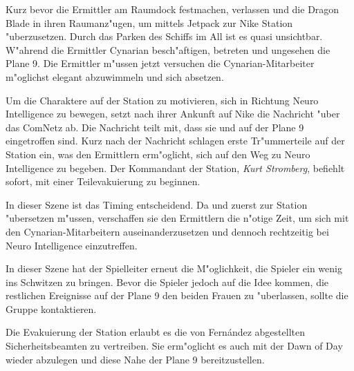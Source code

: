 Kurz bevor die Ermittler am Raumdock festmachen, verlassen \xl{} und \ml{} die Dragon Blade in ihren Raumanz"ugen, um mittels Jetpack zur Nike Station "uberzusetzen. Durch das Parken des Schiffs im All ist es quasi unsichtbar. W"ahrend die Ermittler Cynarian besch"aftigen, betreten \xl{} und \ml{} ungesehen die Plane 9. Die Ermittler m"ussen jetzt versuchen die Cynarian-Mitarbeiter m"oglichst elegant abzuwimmeln und sich absetzen.

Um die Charaktere auf der Station zu motivieren, sich in Richtung Neuro Intelligence zu bewegen, setzt \ml{} nach ihrer Ankunft auf Nike die Nachricht  "uber das ComNetz ab. Die Nachricht teilt mit, dass sie und \xl{} auf der Plane 9 eingetroffen sind. Kurz nach der Nachricht schlagen erste Tr"ummerteile auf der Station ein, was den Ermittlern erm"oglicht, sich auf den Weg zu Neuro Intelligence zu begeben. Der Kommandant der Station, \emph{Kurt Stromberg}, befiehlt sofort, mit einer Teilevakuierung zu beginnen.

\begin{remarks}
	In dieser Szene ist das Timing entscheidend. Da \xl{} und \ml{} zuerst zur Station "ubersetzen m"ussen, verschaffen sie den Ermittlern die n"otige Zeit, um sich mit den Cynarian-Mitarbeitern auseinanderzusetzen und dennoch rechtzeitig bei Neuro Intelligence einzutreffen.
	
	In dieser Szene hat der Spielleiter erneut die M"oglichkeit, die Spieler ein wenig ins Schwitzen zu bringen. Bevor die Spieler jedoch auf die Idee kommen, die restlichen Ereignisse auf der Plane 9 den beiden Frauen zu "uberlassen, sollte \ml{} die Gruppe kontaktieren.

	Die Evakuierung der Station erlaubt es die von Fern\'andez abgestellten Sicherheitsbeamten zu vertreiben. Sie erm"oglicht es auch mit der Dawn of Day wieder abzulegen und diese Nahe der Plane 9 bereitzustellen.	
\end{remarks}
